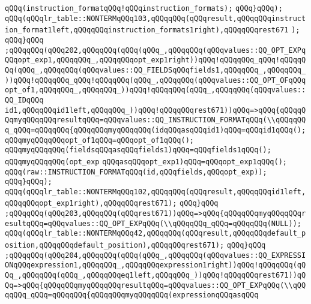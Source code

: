 \verb|qQQq(instruction_formatqQQq!qQQqinstruction_formats);|\newline
\verb|qQQq}qQQq);|\newline
\verb|qQQq(qQQqlr_table::NONTERMqQQq103,qQQqqQQq(qQQqresult,qQQqqQQqinstruction_format1left,qQQqqQQqinstruction_formats1right),qQQqqQQqrest671|\newline
\verb|);|\newline
\verb|qQQq}qQQq|\newline
\verb|;qQQqqQQq(qQQq202,qQQqqQQq(qQQq(qQQq_,qQQqqQQq(qQQqvalues::QQ_OPT_EXPqQQqopt_exp1,qQQqqQQq_,qQQqqQQqopt_exp1right))qQQq!qQQqqQQq_qQQq!qQQqqQQq(qQQq_,qQQqqQQq(qQQqvalues::QQ_FIELDSqQQqfields1,qQQqqQQq_,qQQqqQQq_))qQQq!qQQqqQQq_qQQq!qQQqqQQq(qQQq_,qQQqqQQq(qQQqvalues::QQ_OPT_OFqQQqopt_of1,qQQqqQQq_,qQQqqQQq_))qQQq!qQQqqQQq(qQQq_,qQQqqQQq(qQQqvalues::QQ_IDqQQq|\newline
\verb|id1,qQQqqQQqid1left,qQQqqQQq_))qQQq!qQQqqQQqrest671))qQQq=>qQQq{qQQqqQQqmyqQQqqQQqresultqQQq=qQQqvalues::QQ_INSTRUCTION_FORMATqQQq(\\qQQqqQQq_qQQq=qQQqqQQq{qQQqqQQqmyqQQqqQQq(idqQQqasqQQqid1)qQQq=qQQqid1qQQq();|\newline
\verb|qQQqmyqQQqqQQqopt_of1qQQq=qQQqopt_of1qQQq();|\newline
\verb|qQQqmyqQQqqQQq(fieldsqQQqasqQQqfields1)qQQq=qQQqfields1qQQq();|\newline
\verb|qQQqmyqQQqqQQq(opt_exp|\newline
\verb|qQQqasqQQqopt_exp1)qQQq=qQQqopt_exp1qQQq();|\newline
\verb|qQQq(raw::INSTRUCTION_FORMATqQQq(id,qQQqfields,qQQqopt_exp));|\newline
\verb|qQQq}qQQq);|\newline
\verb|qQQq(qQQqlr_table::NONTERMqQQq102,qQQqqQQq(qQQqresult,qQQqqQQqid1left,qQQqqQQqopt_exp1right),qQQqqQQqrest671);|\newline
\verb|qQQq}qQQq|\newline
\verb|;qQQqqQQq(qQQq203,qQQqqQQq(qQQqrest671))qQQq=>qQQq{qQQqqQQqmyqQQqqQQqresultqQQq=qQQqvalues::QQ_OPT_EXPqQQq(\\qQQqqQQq_qQQq=qQQqqQQq(NULL));|\newline
\verb|qQQq(qQQqlr_table::NONTERMqQQq42,qQQqqQQq(qQQqresult,qQQqqQQqdefault_position,qQQqqQQqdefault_position),qQQqqQQqrest671);|\newline
\verb|qQQq}qQQq|\newline
\verb|;qQQqqQQq(qQQq204,qQQqqQQq(qQQq(qQQq_,qQQqqQQq(qQQqvalues::QQ_EXPRESSIONqQQqexpression1,qQQqqQQq_,qQQqqQQqexpression1right))qQQq!qQQqqQQq(qQQq_,qQQqqQQq(qQQq_,qQQqqQQqeq1left,qQQqqQQq_))qQQq!qQQqqQQqrest671))qQQq=>qQQq{qQQqqQQqmyqQQqqQQqresultqQQq=qQQqvalues::QQ_OPT_EXPqQQq(\\qQQqqQQq_qQQq=qQQqqQQq{qQQqqQQqmyqQQqqQQq(expressionqQQqasqQQq|\newline
